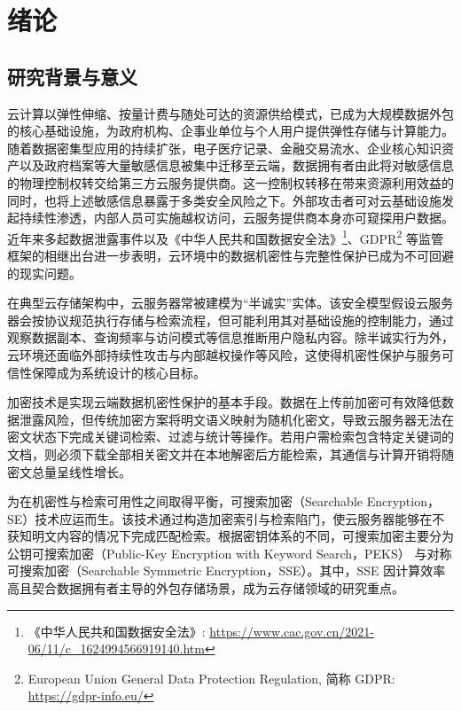 
\chapter{绪论}\label{chap:intro}
\section{研究背景与意义}
云计算以弹性伸缩、按量计费与随处可达的资源供给模式，已成为大规模数据外包的核心基础设施，为政府机构、企事业单位与个人用户提供弹性存储与计算能力\cite{10.1145/1721654.1721672}。随着数据密集型应用的持续扩张，电子医疗记录、金融交易流水、企业核心知识资产以及政府档案等大量敏感信息被集中迁移至云端，数据拥有者由此将对敏感信息的物理控制权转交给第三方云服务提供商。这一控制权转移在带来资源利用效益的同时，也将上述敏感信息暴露于多类安全风险之下。外部攻击者可对云基础设施发起持续性渗透，内部人员可实施越权访问，云服务提供商本身亦可窥探用户数据。近年来多起数据泄露事件以及《中华人民共和国数据安全法》\footnote{《中华人民共和国数据安全法》: \url{https://www.cac.gov.cn/2021-06/11/c_1624994566919140.htm}}、GDPR\footnote{European Union General Data Protection Regulation, 简称 GDPR: \url{https://gdpr-info.eu/}} 等监管框架的相继出台进一步表明，云环境中的数据机密性与完整性保护已成为不可回避的现实问题\cite{6123700}。

在典型云存储架构中，云服务器常被建模为``半诚实''实体\cite{goldreich2001foundations}。该安全模型假设云服务器会按协议规范执行存储与检索流程，但可能利用其对基础设施的控制能力，通过观察数据副本、查询频率与访问模式等信息推断用户隐私内容\cite{10.1007/11863908_29}。除半诚实行为外，云环境还面临外部持续性攻击与内部越权操作等风险，这使得机密性保护与服务可信性保障成为系统设计的核心目标。

加密技术是实现云端数据机密性保护的基本手段。数据在上传前加密可有效降低数据泄露风险，但传统加密方案将明文语义映射为随机化密文，导致云服务器无法在密文状态下完成关键词检索、过滤与统计等操作。若用户需检索包含特定关键词的文档，则必须下载全部相关密文并在本地解密后方能检索，其通信与计算开销将随密文总量呈线性增长。

为在机密性与检索可用性之间取得平衡，可搜索加密（Searchable Encryption，SE）技术应运而生。该技术通过构造加密索引与检索陷门，使云服务器能够在不获知明文内容的情况下完成匹配检索\cite{848445}。根据密钥体系的不同，可搜索加密主要分为公钥可搜索加密（Public-Key Encryption with Keyword Search，PEKS）\cite{10.1007/978-3-540-24676-3_30,10.1007/978-3-540-69839-5_96} 与对称可搜索加密（Searchable Symmetric Encryption，SSE）\cite{10.1145/1180405.1180417,shen2014searchable}。其中，SSE 因计算效率高且契合数据拥有者主导的外包存储场景，成为云存储领域的研究重点。

